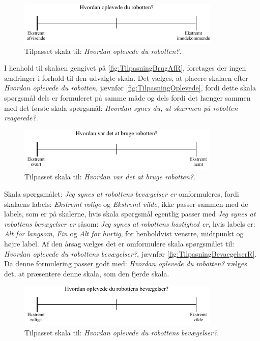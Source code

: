 %
\begin{figure}[H]
\centering
\includegraphics[width =\textwidth]{Figure/TilpasningAfSkalaer/TilpassetOplevede} 
\caption{Tilpasset skala til: \textit{Hvordan oplevede du robotten?}.}
\label{fig:TilpasningOplevede}
\end{figure}
\newpage
\noindent
%
I henhold til skalaen gengivet på \autoref{fig:TilpasningBrugAfR}, foretages der ingen ændringer i forhold til den udvalgte skala. Det vælges, at placere skalaen efter \textit{Hvordan oplevede du robotten}, jævnfør \autoref{fig:TilpasningOplevede}, fordi dette skala spørgsmål dels er formuleret på samme måde og dels fordi det hænger sammen med det første skala spørgsmål: \textit{Hvordan synes du, at skærmen på robotten reagerede?}.
%
\begin{figure}[H]
\centering
\includegraphics[width =\textwidth]{Figure/TilpasningAfSkalaer/TilpassetHvordanVarDetAtBrugeR} 
\caption{Tilpasset skala til: \textit{Hvordan var det at bruge robotten?}.}
\label{fig:TilpasningBrugAfR}
\end{figure}
\noindent
%
Skala spørgsmålet: \textit{Jeg synes at robottens bevægelser er} omformuleres, fordi skalaens labels: \textit{Ekstremt rolige} og \textit{Ekstremt vilde}, ikke passer sammen med de labels, som er på skalerne, hvis skala spørgsmål egentlig passer med \textit{Jeg synes at robottens bevægelser er} såsom: \textit{Jeg synes at robottens hastighed er}, hvis labels er: \textit{Alt for langsom}, \textit{Fin} og \textit{Alt for hurtig}, for henholdvist venstre, midtpunkt og højre label. Af den årsag vælges det er omformulere skala spørgsmålet til: \textit{Hvordan oplevede du robottens bevægelser?}, jævnfør \autoref{fig:TilpasningBevaegelserR}. Da denne formulering passer godt med: \textit{Hvordan oplevede du robotten?} vælges det, at præsentere denne skala, som den fjerde skala. 
%
\begin{figure}[H]
\centering
\includegraphics[width =\textwidth]{Figure/TilpasningAfSkalaer/TilpassetBevaegelserR} 
\caption{Tilpasset skala til: \textit{Hvordan oplevede du robottens bevægelser?}.}
\label{fig:TilpasningBevaegelserR}
\end{figure}
